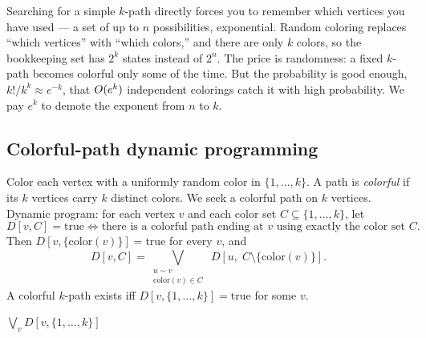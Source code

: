 \begin{intuitionbox}
Searching for a simple $k$-path directly forces you to remember which vertices you have used --- a set of up to $n$ possibilities, exponential. Random coloring replaces ``which vertices'' with ``which colors,'' and there are only $k$ colors, so the bookkeeping set has $2^k$ states instead of $2^n$. The price is randomness: a fixed $k$-path becomes colorful only some of the time. But the probability is good enough, $k!/k^k\approx e^{-k}$, that $O(e^k)$ independent colorings catch it with high probability. We pay $e^k$ to demote the exponent from $n$ to $k$.
\end{intuitionbox}

\subsection{Colorful-path dynamic programming}

Color each vertex with a uniformly random color in $\{1,\dots,k\}$. A path is \emph{colorful} if its $k$ vertices carry $k$ distinct colors. We seek a colorful path on $k$ vertices. Dynamic program: for each vertex $v$ and each color set $C\subseteq\{1,\dots,k\}$, let
\[
  D[v,C] = \text{true} \iff \text{there is a colorful path ending at }v\text{ using exactly the color set }C.
\]
Then $D[v,\{\mathrm{color}(v)\}]=\text{true}$ for every $v$, and
\[
  D[v,C] = \bigvee_{\substack{u\sim v\\ \mathrm{color}(v)\in C}}\; D[u,\; C\setminus\{\mathrm{color}(v)\}].
\]
A colorful $k$-path exists iff $D[v,\{1,\dots,k\}]=\text{true}$ for some $v$.

\begin{algorithm}[H]
\caption{\textsc{ColorfulPath}$(\Gph,k,\mathrm{color})$ --- DP over color subsets}
\label{ch25:alg-colorcoding}
\DontPrintSemicolon
{}
\Return $\bigvee_{v} D[v,\{1,\dots,k\}]$\;
\end{algorithm}

